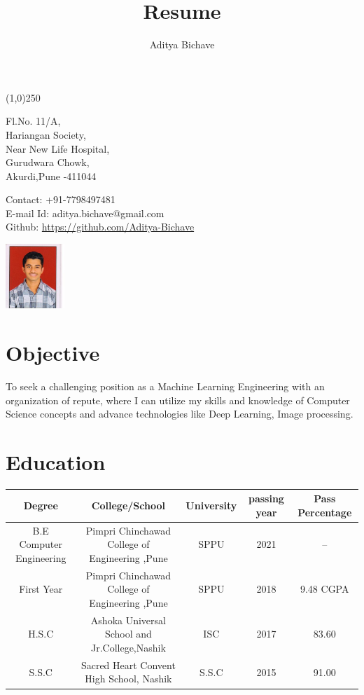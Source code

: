 \documentclass[5pt]{article}
\makeatletter
\renewcommand{\maketitle}{
\begin{center}
{\LARGE\bfseries
\theauthor}

\vspace{.25em}
\line(1,0){250}
\end{center}
\begin{multicols}{2}
\noindent
Fl.No. 11/A,\\
Hariangan Society,\\
Near New Life Hospital,\\
Gurudwara Chowk,\\
Akurdi,Pune -411044\\

\columnbreak
\begin{flushright}
Contact: +91-7798497481\\
E-mail Id: aditya.bichave@gmail.com\\
Github: \url{https://github.com/Aditya-Bichave}
\end{flushright}
\noindent
\hspace{10em}
\includegraphics[width = 6em]{Aditya.jpg}

\end{multicols}



}
\makeatother
\begin{document}
\title{Resume}
\author{Aditya Bichave}
\maketitle

\section{Objective}

To seek a challenging position as a Machine Learning Engineering with an organization of repute, where I can utilize my skills and knowledge of Computer Science concepts and advance technologies like Deep Learning, Image processing.

\section{Education}

\begin{tabular}[8pt]{| c | c | c | c | c |}
\hline
	Degree & College/School & University & passing year & Pass Percentage\\
\hline
	B.E Computer Engineering & Pimpri Chinchawad College of Engineering ,Pune & SPPU & 2021 & -- \\
\hline
	First Year & Pimpri Chinchawad College of Engineering ,Pune & SPPU & 2018 & 9.48 CGPA \\
\hline
	H.S.C & Ashoka Universal School and Jr.College,Nashik & ISC & 2017 & 83.60 \\
\hline
	S.S.C & Sacred Heart Convent High School, Nashik & S.S.C & 2015 & 91.00\\
\hline
\end{tabular} 
\end{document}
